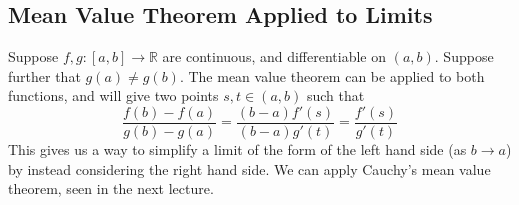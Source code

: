 \subsection{Mean Value Theorem Applied to Limits}
Suppose \(f, g \colon [a,b] \to \mathbb R\) are continuous, and differentiable on \((a, b)\).
Suppose further that \(g(a) \neq g(b)\).
The mean value theorem can be applied to both functions, and will give two points \(s, t \in (a, b)\) such that
\[
	\frac{f(b) - f(a)}{g(b) - g(a)} = \frac{(b-a)f'(s)}{(b-a)g'(t)} = \frac{f'(s)}{g'(t)}
\]
This gives us a way to simplify a limit of the form of the left hand side (as \(b \to a\)) by instead considering the right hand side.
We can apply Cauchy's mean value theorem, seen in the next lecture.
